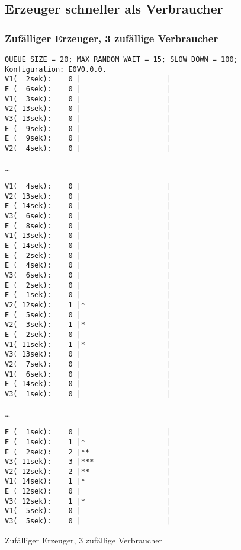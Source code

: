 \subsection{Erzeuger schneller als Verbraucher} %
\subsubsection{Zufälliger Erzeuger, 3 zufällige Verbraucher} %
\label{ssub:zufalliger_erzeuger_3_zufallige_verbraucher}
\begin{quellcode}[H]
\begin{scriptsize}
\begin{spacing}{1.0}
\begin{verbatim}
QUEUE_SIZE = 20; MAX_RANDOM_WAIT = 15; SLOW_DOWN = 100;
Konfiguration: E0V0.0.0.
V1(  2sek):    0 |                    |
E (  6sek):    0 |                    |
V1(  3sek):    0 |                    |
V2( 13sek):    0 |                    |
V3( 13sek):    0 |                    |
E (  9sek):    0 |                    |
E (  9sek):    0 |                    |
V2(  4sek):    0 |                    |
\end{verbatim}

…

\begin{verbatim}
V1(  4sek):    0 |                    |
V2( 13sek):    0 |                    |
E ( 14sek):    0 |                    |
V3(  6sek):    0 |                    |
E (  8sek):    0 |                    |
V1( 13sek):    0 |                    |
E ( 14sek):    0 |                    |
E (  2sek):    0 |                    |
E (  4sek):    0 |                    |
V3(  6sek):    0 |                    |
E (  2sek):    0 |                    |
E (  1sek):    0 |                    |
V2( 12sek):    1 |*                   |
E (  5sek):    0 |                    |
V2(  3sek):    1 |*                   |
E (  2sek):    0 |                    |
V1( 11sek):    1 |*                   |
V3( 13sek):    0 |                    |
V2(  7sek):    0 |                    |
V1(  6sek):    0 |                    |
E ( 14sek):    0 |                    |
V3(  1sek):    0 |                    |
\end{verbatim}

…

\begin{verbatim}
E (  1sek):    0 |                    |
E (  1sek):    1 |*                   |
E (  2sek):    2 |**                  |
V3( 11sek):    3 |***                 |
V2( 12sek):    2 |**                  |
V1( 14sek):    1 |*                   |
E ( 12sek):    0 |                    |
V3( 12sek):    1 |*                   |
V1(  5sek):    0 |                    |
V3(  5sek):    0 |                    |
\end{verbatim}
\caption{Zufälliger Erzeuger, 3 zufällige Verbraucher}
\label{out:esv}
\end{spacing}
\end{scriptsize}
\end{quellcode}

